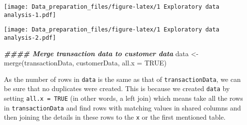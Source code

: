 \documentclass[
]{article}
\newenvironment{Shaded}{\begin{snugshade}}{\end{snugshade}}
\newcommand{\AttributeTok}[1]{\textcolor[rgb]{0.77,0.63,0.00}{#1}}
\newcommand{\ConstantTok}[1]{\textcolor[rgb]{0.00,0.00,0.00}{#1}}
\newcommand{\DecValTok}[1]{\textcolor[rgb]{0.00,0.00,0.81}{#1}}
\newcommand{\DocumentationTok}[1]{\textcolor[rgb]{0.56,0.35,0.01}{\textbf{\textit{#1}}}}
\newcommand{\FloatTok}[1]{\textcolor[rgb]{0.00,0.00,0.81}{#1}}
\newcommand{\FunctionTok}[1]{\textcolor[rgb]{0.00,0.00,0.00}{#1}}
\newcommand{\NormalTok}[1]{#1}
\newcommand{\OtherTok}[1]{\textcolor[rgb]{0.56,0.35,0.01}{#1}}
\newcommand{\SpecialCharTok}[1]{\textcolor[rgb]{0.00,0.00,0.00}{#1}}
\newcommand{\StringTok}[1]{\textcolor[rgb]{0.31,0.60,0.02}{#1}}
\begin{document}
\texttt{[image: Data\_preparation\_files/figure-latex/1 Exploratory data analysis-1.pdf]}

\begin{Shaded}
\end{Shaded}

\texttt{[image: Data\_preparation\_files/figure-latex/1 Exploratory data analysis-2.pdf]}

\begin{Shaded}
\begin{Highlighting}[]
\DocumentationTok{\#\#\#\# Merge transaction data to customer data}
\NormalTok{data }\OtherTok{\textless{}{-}} \FunctionTok{merge}\NormalTok{(transactionData, customerData, }\AttributeTok{all.x =} \ConstantTok{TRUE}\NormalTok{)}
\end{Highlighting}
\end{Shaded}

As the number of rows in \texttt{data} is the same as that of
\texttt{transactionData}, we can be sure that no duplicates were
created. This is because we created \texttt{data} by setting
\texttt{all.x\ =\ TRUE} (in other words, a left join) which means take
all the rows in \texttt{transactionData} and find rows with matching
values in shared columns and then joining the details in these rows to
the \texttt{x} or the first mentioned table.
\end{document}
